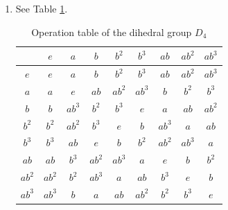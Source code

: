 \documentclass{article}
\begin{document}
\begin{enumerate}
    \item See Table \ref{tab:op-dihedral-d4}.
        \begin{table}[!ht]
            \centering
            \begin{tabular}{c|cccccccc}
                & $e$   & $a$   & $b$    & $b^2$ & $b^3$ & $ab$  & $ab^2$& $ab^3$\\ \hline
            $e$   & $e$   & $a$   & $b$    & $b^2$ & $b^3$ & $ab$  & $ab^2$& $ab^3$\\
            $a$   & $a$   & $e$   & $ab$   & $ab^2$& $ab^3$& $b$   & $b^2$ & $b^3$ \\
            $b$   & $b$   & $ab^3$& $b^2$  & $b^3$ & $e$   & $a$   & $ab$  & $ab^2$\\
            $b^2$ & $b^2$ & $ab^2$& $b^3$  & $e$   & $b$   & $ab^3$& $a$   & $ab$  \\
            $b^3$ & $b^3$ & $ab$  & $e$    & $b$   & $b^2$ & $ab^2$& $ab^3$& $a$   \\
            $ab$  & $ab$  & $b^3$ & $ab^2$ & $ab^3$& $a$   & $e$   & $b$   & $b^2$ \\
            $ab^2$& $ab^2$& $b^2$ & $ab^3$ & $a$   & $ab$  & $b^3$ & $e$   & $b$   \\
            $ab^3$& $ab^3$& $b$   & $a$    & $ab$  & $ab^2$& $b^2$ & $b^3$ & $e$  
            \end{tabular}
            \caption{Operation table of the dihedral group $D_4$}
            \label{tab:op-dihedral-d4}
        \end{table}
    

\end{enumerate}
\end{document}
